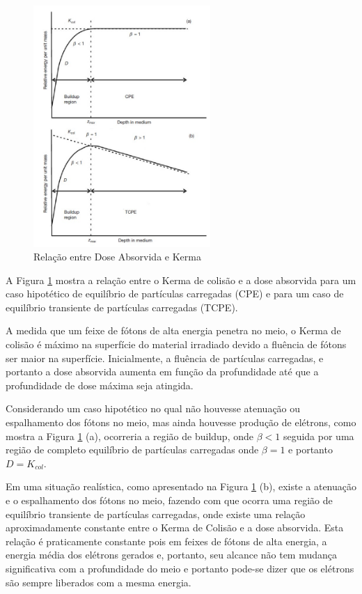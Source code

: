 \documentclass[11pt,a4paper]{article}
\begin{document}
		\begin{figure}[h]
			\centering
			\includegraphics[width=0.60\textwidth]{Imagens/relacaoKermaEDose.jpg}
			\caption{Relação entre Dose Absorvida e Kerma}
			\label{fig:relacaoKermaEDose}
		\end{figure}
		
		A Figura \ref{fig:relacaoKermaEDose} mostra a relação entre o Kerma de colisão e a dose absorvida para um caso hipotético de equilíbrio de partículas carregadas (CPE) e para um caso de equilíbrio transiente de partículas carregadas (TCPE).

		A medida que um feixe de fótons de alta energia penetra no meio, o Kerma de colisão é máximo na superfície do material irradiado devido a fluência de fótons ser maior na superfície. Inicialmente, a fluência de partículas carregadas, e portanto a dose absorvida aumenta em função da profundidade até que a profundidade de dose máxima seja atingida.

		Considerando um caso hipotético no qual não houvesse atenuação ou espalhamento dos fótons no meio, mas ainda houvesse produção de elétrons, como mostra a Figura \ref{fig:relacaoKermaEDose} (a), ocorreria a região de buildup, onde $\beta < 1$ seguida por uma região de completo equilíbrio de partículas carregadas onde $\beta = 1$ e portanto $D = K_{col}$.

		Em uma situação realística, como apresentado na Figura \ref{fig:relacaoKermaEDose} (b), existe a atenuação e o espalhamento dos fótons no meio, fazendo com que ocorra uma região de equilíbrio transiente de partículas carregadas, onde existe uma relação aproximadamente constante entre o Kerma de Colisão e a dose absorvida. Esta relação é praticamente constante pois em feixes de fótons de alta energia, a energia média dos elétrons gerados e, portanto, seu alcance não tem mudança significativa com a profundidade do meio e portanto pode-se dizer que os elétrons são sempre liberados com a mesma energia.
\end{document}
